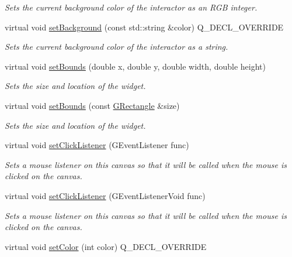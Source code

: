 \begin{DoxyCompactItemize}
\begin{DoxyCompactList}\small\item\em Sets the current background color of the interactor as an R\+GB integer. \end{DoxyCompactList}\item 
virtual void \mbox{\hyperlink{classGCanvas_a222fcfb542aa6094c7e0de671bd69627}{set\+Background}} (const std\+::string \&color) Q\+\_\+\+D\+E\+C\+L\+\_\+\+O\+V\+E\+R\+R\+I\+DE
\begin{DoxyCompactList}\small\item\em Sets the current background color of the interactor as a string. \end{DoxyCompactList}\item 
virtual void \mbox{\hyperlink{classGInteractor_a2aae8197624b72265ab83b4f1bc73f2f}{set\+Bounds}} (double x, double y, double width, double height)
\begin{DoxyCompactList}\small\item\em Sets the size and location of the widget. \end{DoxyCompactList}\item 
virtual void \mbox{\hyperlink{classGInteractor_acada386653f008cacc7cce86426bef7c}{set\+Bounds}} (const \mbox{\hyperlink{classGRectangle}{G\+Rectangle}} \&size)
\begin{DoxyCompactList}\small\item\em Sets the size and location of the widget. \end{DoxyCompactList}\item 
virtual void \mbox{\hyperlink{classGCanvas_abd40af6921242584d0954f173911b190}{set\+Click\+Listener}} (G\+Event\+Listener func)
\begin{DoxyCompactList}\small\item\em Sets a mouse listener on this canvas so that it will be called when the mouse is clicked on the canvas. \end{DoxyCompactList}\item 
virtual void \mbox{\hyperlink{classGCanvas_a856414c92df90f56f3877475eb3f8fc4}{set\+Click\+Listener}} (G\+Event\+Listener\+Void func)
\begin{DoxyCompactList}\small\item\em Sets a mouse listener on this canvas so that it will be called when the mouse is clicked on the canvas. \end{DoxyCompactList}\item 
virtual void \mbox{\hyperlink{classGCanvas_a292eb0ce61f3fdb1d28b17e1e34928f7}{set\+Color}} (int color) Q\+\_\+\+D\+E\+C\+L\+\_\+\+O\+V\+E\+R\+R\+I\+DE

\end{DoxyCompactItemize}
